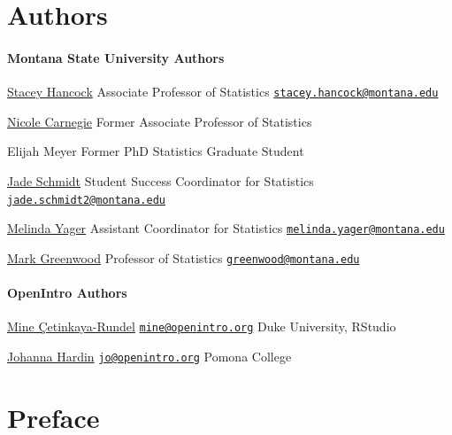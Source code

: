 \documentclass[
  10pt,
  openany]{book}
\theoremstyle{definition}
\theoremstyle{definition}
\theoremstyle{definition}
\theoremstyle{definition}
\theoremstyle{remark}
\begin{document}
\chapter*{Authors}\label{authors}

\subsubsection*{Montana State University Authors}\label{montana-state-university-authors}

\href{http://www.math.montana.edu/shancock/}{Stacey Hancock}
Associate Professor of Statistics
\href{mailto:stacey.hancock@montana.edu}{\nolinkurl{stacey.hancock@montana.edu}}

\href{https://math.montana.edu/directory/faculty/2040044/nicole-carnegie}{Nicole Carnegie}
Former Associate Professor of Statistics

Elijah Meyer
Former PhD Statistics Graduate Student

\href{http://www.math.montana.edu/directory/faculty/1524571/jade-schmidt}{Jade Schmidt}
Student Success Coordinator for Statistics
\href{mailto:jade.schmidt2@montana.edu}{\nolinkurl{jade.schmidt2@montana.edu}}

\href{http://www.math.montana.edu/directory/faculty/1582830/melinda-yager}{Melinda Yager}
Assistant Coordinator for Statistics
\href{mailto:melinda.yager@montana.edu}{\nolinkurl{melinda.yager@montana.edu}}

\href{https://www.math.montana.edu/directory/faculty/1524138/mark-greenwood}{Mark Greenwood}
Professor of Statistics
\href{mailto:greenwood@montana.edu}{\nolinkurl{greenwood@montana.edu}}

\subsubsection*{OpenIntro Authors}\label{openintro-authors}

\href{http://mine-cr.com/}{Mine Çetinkaya-Rundel}
\href{mailto:mine@openintro.org}{\nolinkurl{mine@openintro.org}}
Duke University, RStudio

\href{https://research.pomona.edu/johardin/}{Johanna Hardin}
\href{mailto:jo@openintro.org}{\nolinkurl{jo@openintro.org}}
Pomona College

\chapter*{Preface}\label{preface}
\end{document}
